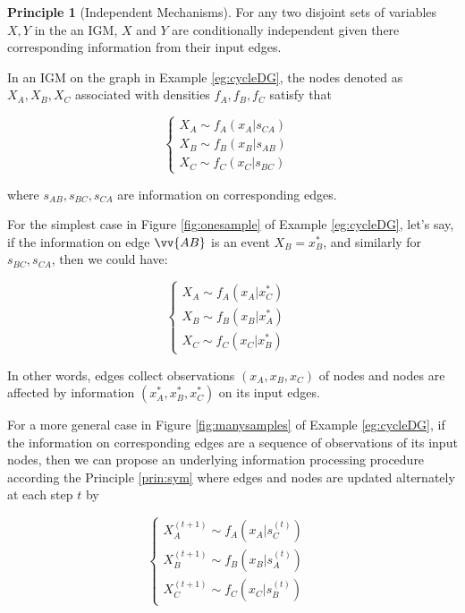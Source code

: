 \documentclass{article}
\theoremstyle{definition}
\theoremstyle{remark}
\theoremstyle{definition}
\newtheorem{principle}[theorem]{Principle}
\begin{document}
\begin{CJK*}{UTF8}{gbsn}
\begin{principle}[Independent Mechanisms]
    For any two disjoint sets of variables $X, Y$ in the an IGM, $X$ and $Y$ are conditionally independent given there corresponding information from their input edges.
\end{principle}

In an IGM on the graph in Example \ref{eg:cycleDG}, the nodes denoted as $X_A, X_B, X_C$ associated with densities $f_A, f_B, f_C$ satisfy that 

\begin{equation} \label{eq:1}
\left\{
     \begin{array}{lr}
     X_A \sim f_A(x_A|s_{CA}) &  \\
     X_B \sim f_B(x_B|s_{AB}) & \\
     X_C \sim f_C(x_C|s_{BC}) &  
     \end{array}
\right.
\end{equation}

where $s_{AB}, s_{BC}, s_{CA}$ are information on corresponding edges.

For the simplest case in Figure \ref{fig:onesample} of Example \ref{eg:cycleDG}, let's say, if the information on edge $\vv{AB}$ is an event $X_B=x_B^*$, and similarly for $s_{BC}, s_{CA}$, then we could have:

\begin{equation}
\left\{
     \begin{array}{lr}
     X_A \sim f_A(x_A|x_{C}^*) &  \\
     X_B \sim f_B(x_B|x_{A}^*) & \\
     X_C \sim f_C(x_C|x_{B}^*) &  
     \end{array}
\right.
\end{equation}

In other words, edges collect observations $(x_A, x_B, x_C)$ of nodes and nodes are affected by information $(x_A^*, x_B^*, x_C^*)$ on its input edges. 

For a more general case in Figure \ref{fig:manysamples} of Example \ref{eg:cycleDG}, if the information on corresponding edges are a sequence of observations of its input nodes, then we can propose an underlying information processing procedure according the Principle \ref{prin:sym} where edges and nodes are updated alternately at each step $t$ by

\begin{equation} \label{eq:evolve}
\left\{
     \begin{array}{lr}
     X_A^{(t+1)} \sim f_A(x_A|s_{C}^{(t)}) &  \\
     X_B^{(t+1)} \sim f_B(x_B|s_{A}^{(t)}) & \\
     X_C^{(t+1)} \sim f_C(x_C|s_{B}^{(t)}) &  
     \end{array}
\right.
\end{equation}


\end{CJK*}
\end{document}
